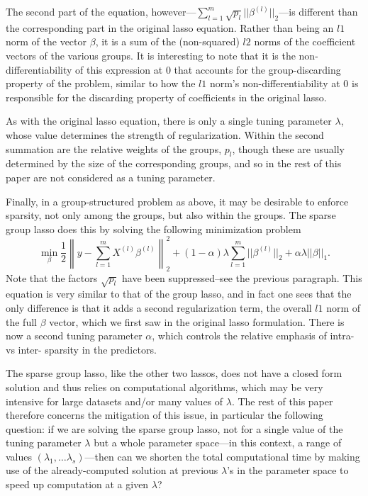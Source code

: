 \documentclass[titlepage]{article}
\newcommand{\norm}[1]{\left\lVert #1 \right\rVert}
\begin{document}
The second part of the equation, however---$\sum_{l=1}^m\sqrt{p_l}||\beta^{(l)}||_2$---is different than the corresponding part in the original lasso equation. Rather than being an $l1$ norm of the vector $\beta$, it is a sum of the (non-squared) $l2$ norms of the coefficient vectors of the various groups. It is interesting to note that it is the non-differentiability of this expression at $0$ that accounts for the group-discarding property of the problem, similar to how the $l1$ norm's non-differentiability at 0 is responsible for the discarding property of coefficients in the original lasso. 

As with the original lasso equation, there is only a single tuning parameter $\lambda$, whose value determines the strength of regularization. Within the second summation are the relative weights of the groups, $p_l$, though these are usually determined by the size of the corresponding groups, and so in the rest of this paper are not considered as a tuning parameter.

Finally, in a group-structured problem as above, it may be desirable to enforce sparsity, not only among the groups, but also within the groups. The sparse group lasso \citep{simon2013sparse} does this by solving the following minimization problem
\begin{equation}
  \label{eq:sparsegl}
\min_{\beta}\frac{1}{2}\norm{y-\sum_{l=1}^mX^{(l)}\beta^{(l)}}_2^2 + (1-\alpha)\lambda\sum_{l=1}^m||\beta^{(l)}||_2+\alpha\lambda||\beta||_1.
\end{equation}
Note that the factors $\sqrt{p_l}$ have been suppressed--see the previous paragraph.  This equation is very similar to that of the group lasso, and in fact one sees that the only difference is that it adds a second regularization term, the overall $l1$ norm of the full $\beta$ vector, which we first saw in the original lasso formulation.  There is now a second tuning parameter $\alpha$, which controls the relative emphasis of intra- vs inter- sparsity in the predictors.

The sparse group lasso, like the other two lassos, does not have a closed form solution and thus relies on computational algorithms, which may be very intensive for large datasets and/or many values of $\lambda$. The rest of this paper therefore concerns the mitigation of this issue, in particular the following question: if we are solving the sparse group lasso, not for a single value of the tuning parameter $\lambda$ but a whole parameter space---in this context, a range of values $(\lambda_1,\dots \lambda_s)$---then can we shorten the total computational time by making use of the already-computed solution at previous $\lambda$'s in the parameter space to speed up computation at a given $\lambda$?
\end{document}

